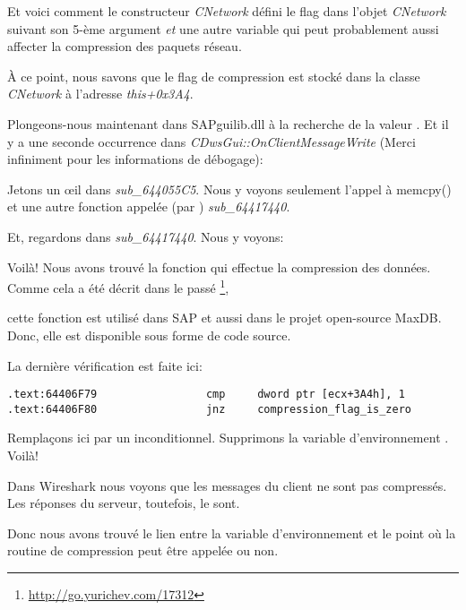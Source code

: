 Et voici comment le constructeur \emph{CNetwork} défini le flag dans l'objet \emph{CNetwork}
suivant son 5-ème argument \emph{et} une autre variable qui peut probablement aussi
affecter la compression des paquets réseau.



À ce point, nous savons que le flag de compression est stocké dans la classe
\emph{CNetwork} à l'adresse \emph{this+0x3A4}.

Plongeons-nous maintenant dans SAPguilib.dll à la recherche de la valeur .
Et il y a une seconde occurrence dans \emph{CDwsGui::OnClientMessageWrite} (Merci
infiniment pour les informations de débogage):



Jetons un \oe{}il dans \emph{sub\_644055C5}. Nous y voyons seulement l'appel à memcpy()
et une autre fonction appelée (par \IDA) \emph{sub\_64417440}.

Et, regardons dans \emph{sub\_64417440}. Nous y voyons:



Voilà! Nous avons trouvé la fonction qui effectue la compression des données.
Comme cela a été décrit dans le passé
\footnote{\url{http://go.yurichev.com/17312}},

cette fonction est utilisé dans SAP et aussi dans le projet open-source MaxDB.
Donc, elle est disponible sous forme de code source.

La dernière vérification est faite ici:

\begin{lstlisting}[style=customasmx86]
.text:64406F79                 cmp     dword ptr [ecx+3A4h], 1
.text:64406F80                 jnz     compression_flag_is_zero
\end{lstlisting}

Remplaçons ici \JNZ par un \JMP inconditionnel. Supprimons la variable d'environnement
\TDWNC. Voilà!

Dans Wireshark nous voyons que les messages du client ne sont pas compressés. Les
réponses du serveur, toutefois, le sont.

Donc nous avons trouvé le lien entre la variable d'environnement et le point où la
routine de compression peut être appelée ou non.

